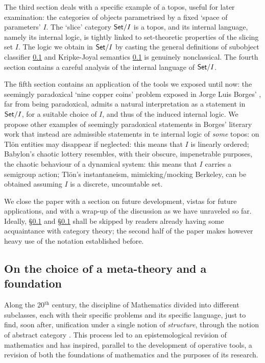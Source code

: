 The third section deals with a specific example of a topos, useful for later examination: the categories of objects parametrised by a fixed `space of parameters' $I$. The `slice' category $\mathsf{Set}/I$ is a topos, and its internal language, namely its internal logic, is tightly linked to set-theoretic properties of the slicing set $I$. The logic we obtain in $\mathsf{Set}/I$ by casting the general definitions of subobject classifier \ref{} and Kripke-Joyal semantics \ref{} is genuinely nonclassical.
The fourth section contains a careful analysis of the internal language of $\mathsf{Set}/I$.

The fifth section contains an application of the tools we exposed until now: the seemingly paradoxical `nine copper coins' problem exposed in Jorge Luis Borges' \cite{Borges1963}, far from being paradoxical, admits a natural interpretation as a statement in $\mathsf{Set}/I$, for a suitable choice of $I$, and thus of the induced internal logic. We propose other examples of seemingly paradoxical statements in Borges' literary work that instead are admissible statements in te internal logic of \emph{some} topos: on Tl\"on entities may disappear if neglected: this means that $I$ is linearly ordered; Babylon's chaotic lottery resembles, with their obscure, impenetrable purposes, the chaotic behaviour of a dynamical system: this means that $I$ carries a semigroup action; Tl\"on's instantaneism, mimicking/mocking Berkeley, can be obtained assuming $I$ is a discrete, uncountable set.

We close the paper with a section on future development, vistas for future applications, and with a wrap-up of the discussion as we have unraveled so far. Ideally, §\ref{} and §\ref{} shall be skipped by readers already having some acquaintance with category theory; the second half of the paper makes however heavy use of the notation established before.
\subsection{On the choice of a meta-theory and a foundation}
Along the 20$^\text{th}$ century, the discipline of Mathematics divided into different subclasses, each with their specific problems and its specific language, just to find, soon after, unification under a single notion of \emph{structure}, through the notion of abstract category \cite{gtone}. This process led to an epistemological revision of mathematics and has inspired, parallel to the development of operative tools, a revision of both the foundations of mathematics and the purposes of its research. 

